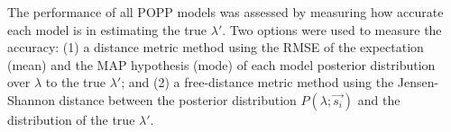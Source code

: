 
The performance of all POPP models was assessed by measuring how accurate each model is in estimating the true $\lambda'$. Two options were used to measure the accuracy: (1) a distance metric method using the RMSE of the expectation (mean) and the MAP hypothesis (mode) of each model posterior distribution over $\lambda$ to the true $\lambda'$; and (2) a free-distance metric method using the Jensen-Shannon distance between the posterior distribution $P(\lambda ; \vec{s_i})$ and the distribution of the true $\lambda'$. 

